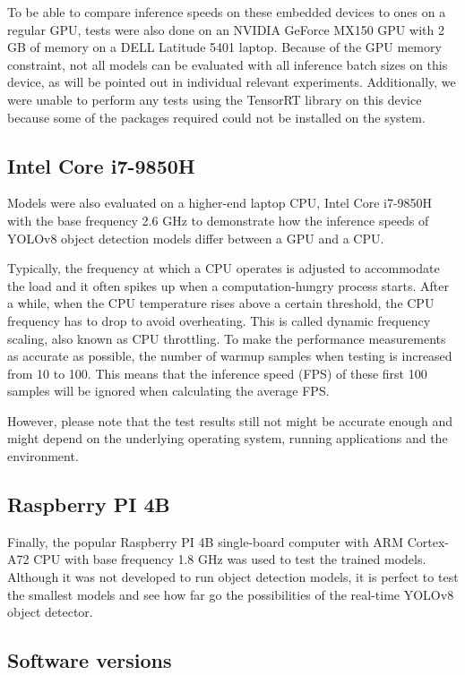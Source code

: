 To be able to compare inference speeds on these embedded devices to ones on a
regular GPU, tests were also done on an NVIDIA GeForce MX150 GPU with 2 GB of
memory on a DELL Latitude 5401 laptop. Because of the GPU memory constraint, not
all models can be evaluated with all inference batch sizes on this device, as
will be pointed out in individual relevant experiments. Additionally, we were
unable to perform any tests using the TensorRT library on this device because
some of the packages required could not be installed on the system.


\subsection{Intel Core i7-9850H}

Models were also evaluated on a higher-end laptop CPU, Intel Core i7-9850H with
the base frequency 2.6 GHz to demonstrate how the inference speeds of YOLOv8
object detection models differ between a GPU and a CPU.

Typically, the frequency at which a CPU operates is adjusted to accommodate the
load and it often spikes up when a computation-hungry process starts. After a
while, when the CPU temperature rises above a certain threshold, the CPU
frequency has to drop to avoid overheating. This is called dynamic frequency
scaling, also known as CPU throttling. To make the performance measurements as
accurate as possible, the number of warmup samples when testing is increased
from 10 to 100. This means that the inference speed (FPS) of these first 100
samples will be ignored when calculating the average FPS.

However, please note that the test results still not might be accurate enough
and might depend on the underlying operating system, running applications and
the environment.


\subsection{Raspberry PI 4B}

Finally, the popular Raspberry PI 4B single-board computer with ARM Cortex-A72
CPU with base frequency 1.8 GHz was used to test the trained models. Although it
was not developed to run object detection models, it is perfect to test the
smallest models and see how far go the possibilities of the real-time YOLOv8
object detector.


\subsection{Software versions}

